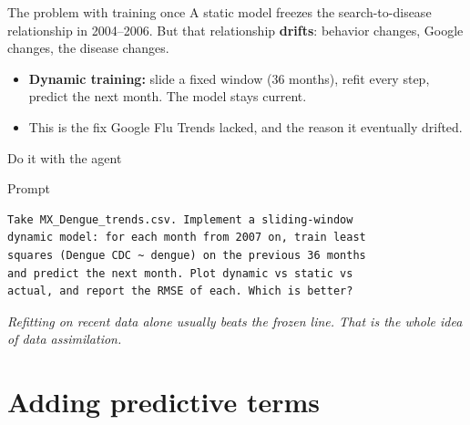 \documentclass[aspectratio=169,11pt]{beamer}
\begin{document}
\begin{frame}{The problem with training once}
  A static model freezes the search-to-disease relationship in 2004--2006. But that
  relationship \textbf{drifts}: behavior changes, Google changes, the disease changes.
  \begin{center}
  \end{center}
  \vspace{0.3em}
  \begin{itemize}
    \item \textbf{Dynamic training:} slide a fixed window (36 months), refit every step,
          predict the next month. The model stays current.
    \item This is the fix Google Flu Trends lacked, and the reason it eventually drifted.
  \end{itemize}
\end{frame}

\begin{frame}[fragile]{Do it with the agent}
  \begin{block}{Prompt}
  \begin{lstlisting}
Take MX_Dengue_trends.csv. Implement a sliding-window
dynamic model: for each month from 2007 on, train least
squares (Dengue CDC ~ dengue) on the previous 36 months
and predict the next month. Plot dynamic vs static vs
actual, and report the RMSE of each. Which is better?
  \end{lstlisting}
  \end{block}
  \begin{center}
    \itshape Refitting on recent data alone usually beats the frozen line. That is the whole
    idea of data assimilation.
  \end{center}
\end{frame}

\section{Adding predictive terms}
\end{document}
